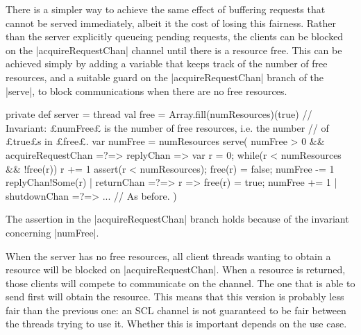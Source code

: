 There is a simpler way to achieve the same effect of buffering requests that
cannot be served immediately, albeit it the cost of losing this fairness.
Rather than the server explicitly queueing pending requests, the clients can
be blocked on the |acquireRequestChan| channel until there is a resource free.
This can be achieved simply by adding a variable that keeps track of the
number of free resources, and a suitable guard on the |acquireRequestChan|
branch of the |serve|, to block communications when there are no free
resources.%
%
\begin{scala}
  private def server = thread{
    val free = Array.fill(numResources)(true)
    // Invariant: £numFree£ is the number of free resources, i.e. the number 
    // of £true£s in £free£.
    var numFree = numResources
    serve(
      numFree > 0 && acquireRequestChan =?=> { replyChan => 
	var r = 0; while(r < numResources && !free(r)) r += 1
	assert(r < numResources); free(r) = false; numFree -= 1
        replyChan!Some(r)
      }
      | returnChan =?=> { r => free(r) = true; numFree += 1 }
      | shutdownChan =?=> { ... } // As before.
    )
  }
\end{scala}
%
The assertion in the |acquireRequestChan| branch holds because of
the invariant concerning |numFree|.

When the server has no free resources, all client threads wanting to obtain a
resource will be blocked on |acquireRequestChan|.
%
When a resource is returned, those clients will compete to communicate on the
channel.  The one that is able to send first will obtain the resource.
%
This means that this version is probably less fair than the previous one: an SCL
channel is not guaranteed to be fair between the threads trying to use it.
Whether this is important depends on the use case.







